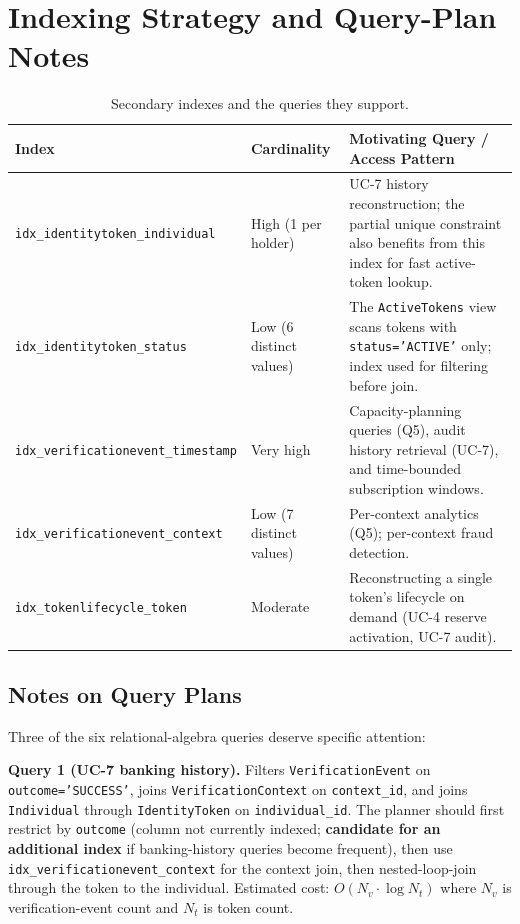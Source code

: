 \documentclass[11pt,letterpaper]{article}
\newcommand{\entity}[1]{\texttt{\color{navydark}#1}}
\newcommand{\thead}[1]{\textbf{\color{white}\small #1}}
\begin{document}
\section{Indexing Strategy and Query-Plan Notes}
\label{app:indexing}

\begin{table}[H]
\centering
\footnotesize
\caption{Secondary indexes and the queries they support.}
\begin{tabularx}{\textwidth}{l l >{\RaggedRight\arraybackslash}X}
\toprule
\rowcolor{tabheader}
\thead{Index} & \thead{Cardinality} & \thead{Motivating Query / Access Pattern} \\
\midrule
\texttt{idx\_identitytoken\_individual} & High (1 per holder) & UC-7 history reconstruction; the partial unique constraint also benefits from this index for fast active-token lookup. \\
\texttt{idx\_identitytoken\_status} & Low (6 distinct values) & The \texttt{ActiveTokens} view scans tokens with \texttt{status='ACTIVE'} only; index used for filtering before join. \\
\texttt{idx\_verificationevent\_timestamp} & Very high & Capacity-planning queries (Q5), audit history retrieval (UC-7), and time-bounded subscription windows. \\
\texttt{idx\_verificationevent\_context} & Low (7 distinct values) & Per-context analytics (Q5); per-context fraud detection. \\
\texttt{idx\_tokenlifecycle\_token} & Moderate & Reconstructing a single token's lifecycle on demand (UC-4 reserve activation, UC-7 audit). \\
\bottomrule
\end{tabularx}
\end{table}

\subsection*{Notes on Query Plans}

Three of the six relational-algebra queries deserve specific attention:

\textbf{Query 1 (UC-7 banking history).} Filters \entity{VerificationEvent} on \texttt{outcome='SUCCESS'}, joins \entity{VerificationContext} on \texttt{context\_id}, and joins \entity{Individual} through \entity{IdentityToken} on \texttt{individual\_id}. The planner should first restrict by \texttt{outcome} (column not currently indexed; \textbf{candidate for an additional index} if banking-history queries become frequent), then use \texttt{idx\_verificationevent\_context} for the context join, then nested-loop-join through the token to the individual. Estimated cost: $O(N_v \cdot \log N_t)$ where $N_v$ is verification-event count and $N_t$ is token count.
\end{document}
